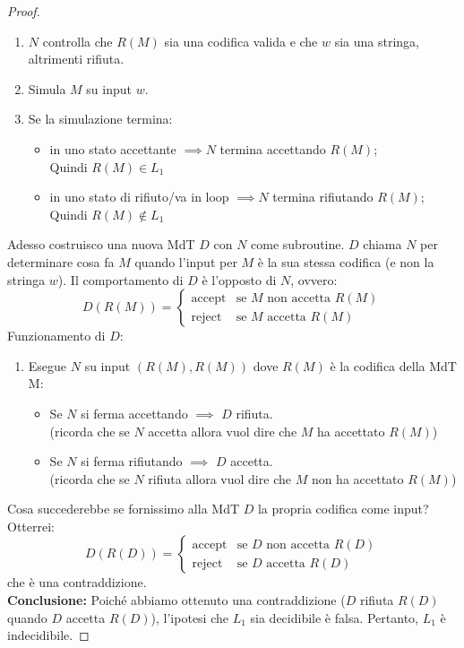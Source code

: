 \documentclass{article}  %
\theoremstyle{definition}
\begin{document}
\begin{esercizio}[Esercizio 2.2]
\begin{proof}
\begin{enumerate}
    \item $N$ controlla che $R(M)$ sia una codifica valida e che $w$ sia una stringa, altrimenti rifiuta.
    \item Simula $M$ su input $w$.
    \item Se la simulazione termina:
    \begin{itemize}
      \item in uno stato accettante $\implies N$ termina accettando $R(M)$; \\ Quindi $R(M) \in L_1$
      \item in uno stato di rifiuto/va in loop $\implies N$ termina rifiutando $R(M)$; \\ Quindi $R(M) \notin L_1$
    \end{itemize}
  \end{enumerate}
Adesso costruisco una nuova MdT $D$ con $N$ come subroutine. $D$ chiama $N$ per determinare cosa fa $M$ quando l'input per $M$ è la sua 
stessa codifica (e non la stringa $w$). Il comportamento di $D$ è l'opposto di $N$, ovvero:
\[
D(R(M)) =
\begin{cases}
\text{accept} & \text{se } M \text{ non accetta } R(M)\\
\text{reject} & \text{se } M \text{  accetta } R(M)
\end{cases}
\]
Funzionamento di $D$:
\begin{enumerate}
\item Esegue $N$ su input $(R(M),R(M))$ dove $R(M)$ è la codifica della MdT M:
\begin{itemize}
    \item Se $N$ si ferma accettando $\implies$ $D$ rifiuta.\\
    (ricorda che se $N$ accetta allora vuol dire che $M$ ha accettato $R(M)$)
    \item Se $N$ si ferma rifiutando $\implies$ $D$ accetta. \\
    (ricorda che se $N$ rifiuta allora vuol dire che $M$ non ha accettato $R(M)$)
\end{itemize} 
\end{enumerate}
Cosa succederebbe se fornissimo alla MdT $D$ la propria codifica come input? Otterrei:
\[
D(R(D)) =
\begin{cases}
\text{accept} & \text{se } D \text{ non accetta } R(D)\\
\text{reject} & \text{se } D \text{  accetta } R(D)
\end{cases}
\]
che è una contraddizione.\\
\textbf{Conclusione:} Poiché abbiamo ottenuto una contraddizione ($D$ rifiuta $R(D)$ quando $D$ accetta $R(D)$), l’ipotesi che $L_1$ sia decidibile è falsa. Pertanto, $L_1$ è indecidibile.
 \end{proof}
\end{esercizio}
\end{document}
